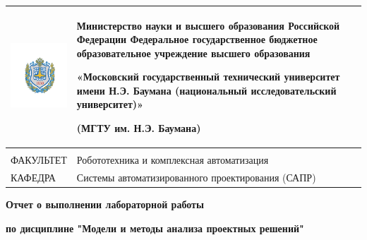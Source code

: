 \documentclass[12pt, a4paper]{article}
\newcommand{\Faculty}{Робототехника и комплексная автоматизация}
\newcommand{\Department}{Системы автоматизированного проектирования (САПР)}
\newcommand{\TitleText}{Отчет о выполнении лабораторной работы}
\newcommand{\Title}{{\Huge \textbf{\TitleText}}}
\newcommand{\SubTitleText}{по дисциплине "Модели и методы анализа проектных решений"}
\newcommand{\SubTitle}{{\LARGE \textbf{\SubTitleText}}}
\begin{document}
	\thispagestyle{empty}
	\begin{tabular}{m{0.15\linewidth}m{0.85\linewidth}}
	\centering
	\includegraphics[scale=0.07]{static/bmstu.pdf} &
	{\centering
	Министерство науки и высшего образования Российской Федерации
	Федеральное государственное бюджетное образовательное учреждение
	высшего образования
	
	«Московский государственный технический университет
	имени Н.Э. Баумана
	(национальный исследовательский университет)»
	
	(МГТУ им. Н.Э. Баумана)
	
    } \\
	\hline
	\multicolumn{1}{p{0.15\textwidth}}{} & \multicolumn{1}{p{0.85\textwidth}}{} \\
	\multicolumn{1}{p{0.15\textwidth}}{ФАКУЛЬТЕТ}	&	\multicolumn{1}{p{0.85\textwidth}}{\Faculty}	\\
	\multicolumn{1}{p{0.15\textwidth}}{КАФЕДРА}	&	\multicolumn{1}{p{0.85\textwidth}}{\Department}	\\
	\end{tabular}
\vfil

\begin{center}
	\Title
	
	\SubTitle
\end{center}
\end{document}
